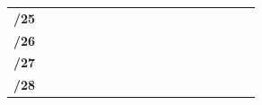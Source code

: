 \documentclass[11pt,a4paper]{report}
\begin{document}
\begin{center}
\begin{longtable}{rlcccccccccccccccc}
                \endhead
                \cline{1-1} \cline{3-18}
                \endfoot
                \endlastfoot
                \textbf{/25}                                                                                             &                       &                           &                           &                           &                           &                           &                            &                            &                            &                                 &                                 &                                 &                                 &                                 &                                 & \cellcolor[HTML]{F4B084}         & \cellcolor[HTML]{F4B084}        \\
                \textbf{/26}                                                                                             &                       &                           &                           &                           &                           &                           &                            &                            &                            &                                 &                                 &                                 &                                 & \cellcolor[HTML]{A9D08E}        & \cellcolor[HTML]{A9D08E}        &                                  &                                 \\
                \textbf{/27}                                                                                             &                       &                           &                           &                           &                           &                           &                            &                            &                            &                                 &                                 & \cellcolor[HTML]{FFD966}        & \cellcolor[HTML]{FFD966}        &                                 &                                 &                                  &                                 \\
                \textbf{/28}                                                                                             &                       &                           &                           &                           &                           &                           &                            &                            &                            & \cellcolor[HTML]{BFBFBF}        & \cellcolor[HTML]{BFBFBF}        &                                 &                                 &                                 &                                 &                                  &                                 \\

\end{longtable}
\end{center}
\end{document}
